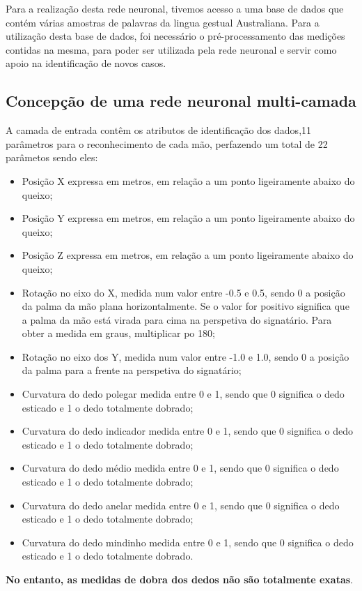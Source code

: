 \documentclass[10pt,a4paper]{article}
\begin{document}
Para a realização desta rede neuronal, tivemos acesso a uma base de dados que contém várias amostras de palavras da lingua gestual Australiana. Para a utilização desta base de dados, foi necessário o pré-processamento das medições contidas na mesma, para poder ser utilizada pela rede neuronal e servir como apoio na identificação de novos casos.

\subsection{Concepção de uma rede neuronal multi-camada}
\subitem

A camada de entrada contêm os atributos de identificação dos dados,11 parâmetros para o reconhecimento de cada mão, perfazendo um total de 22 parâmetos sendo eles:
\begin{itemize}
\item Posição X expressa em metros, em relação a um ponto ligeiramente abaixo do queixo;
\item Posição Y expressa em metros, em relação a um ponto ligeiramente abaixo do queixo;
\item Posição Z expressa em metros, em relação a um ponto ligeiramente abaixo do queixo;
\item Rotação no eixo do X, medida num valor entre -0.5 e 0.5, sendo 0 a posição da palma da mão plana horizontalmente. Se o valor for positivo significa que a palma da mão está virada para cima na perspetiva do signatário. Para obter a medida em graus, multiplicar po 180;
\item Rotação no eixo dos Y, medida num valor entre -1.0 e 1.0, sendo 0 a posição da palma para a frente na perspetiva do signatário;
\item Curvatura do dedo polegar medida entre 0 e 1, sendo que 0 significa o dedo esticado e 1 o dedo totalmente dobrado;
\item Curvatura do dedo indicador medida entre 0 e 1, sendo que 0 significa o dedo esticado e 1 o dedo totalmente dobrado;
\item Curvatura do dedo médio medida entre 0 e 1, sendo que 0 significa o dedo esticado e 1 o dedo totalmente dobrado;
\item Curvatura do dedo anelar medida entre 0 e 1, sendo que 0 significa o dedo esticado e 1 o dedo totalmente dobrado;
\item Curvatura do dedo mindinho medida entre 0 e 1, sendo que 0 significa o dedo esticado e 1 o dedo totalmente dobrado.
\end{itemize}
\textbf{No entanto, as medidas de dobra dos dedos não são totalmente exatas}.
\end{document}
